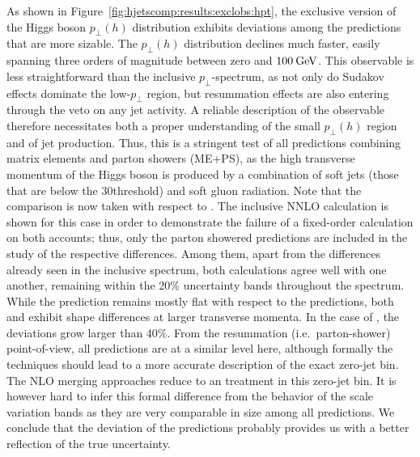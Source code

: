 As shown in Figure~\ref{fig:hjetscomp:results:exclobs:hpt}, the
exclusive version of  the Higgs boson $p_\perp(h)$ distribution exhibits deviations among the
predictions that are more sizable. The $p_\perp(h)$ distribution 
declines much faster, easily spanning three orders of magnitude 
between zero and $100\text{\:GeV}$. This observable is less straightforward 
than the inclusive $p_\perp$-spectrum, as not only do Sudakov effects 
dominate the low-$p_\perp$ region, but resummation effects are also 
entering through the veto on any jet activity. A reliable description
of the observable therefore necessitates both a proper understanding
of the small $p_\perp(h)$ region and of jet production. Thus,
this is a stringent test of all predictions combining matrix elements
and parton showers (ME+PS), as
the high transverse momentum of the Higgs boson is produced by a
combination of soft jets (those that are below the $30$\gev threshold)
and soft gluon radiation. Note that the comparison is now taken with respect to
\Powheg \NNLOPS. The inclusive 
NNLO calculation is shown for this case in order  to demonstrate the failure of a fixed-order 
calculation on both accounts; thus, only the parton showered 
predictions are included in the study of the respective differences. 
Among them, apart from the differences already seen in the inclusive 
spectrum, both \NNLOPS calculations agree  well with one another, 
remaining within the 20\% uncertainty bands throughout the spectrum. 
While the \Sherpa \MEPSatNLO prediction remains mostly flat with respect to the \NNLOPS 
predictions, both \MGaMC and \Herwig exhibit shape differences  at
larger transverse momenta. In the case of \Herwig, the deviations  grow
larger than 40\%. From the resummation (i.e.~parton-shower)
point-of-view, all predictions are at a similar level here, although
formally the \NNLOPS techniques should lead to a more accurate description of
the exact zero-jet bin. The NLO merging approaches reduce to an \NLOPS
treatment in this zero-jet bin. It is however hard to infer this
formal difference from the behavior of the scale variation bands as
they are very comparable in size among all predictions. We conclude
that the deviation of the predictions probably provides us with a
better reflection of the true uncertainty.

